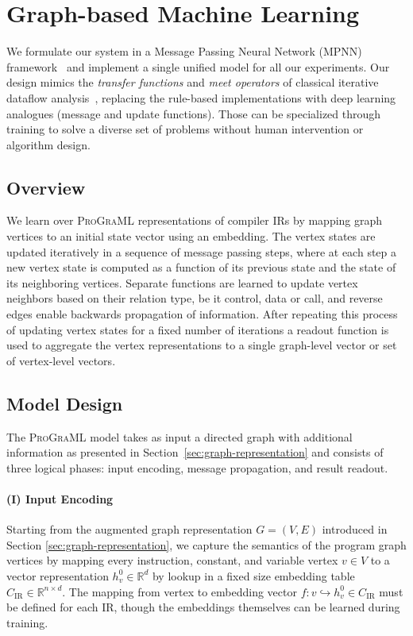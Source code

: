 \section{Graph-based Machine Learning}
\label{sec:graph-based-machine-learning}

We formulate our system in a Message Passing Neural Network (MPNN)
framework~\cite{Gilmer2017,Li2015a} and implement a single unified
model for all our experiments. Our design mimics the \emph{transfer
  functions} and \emph{meet operators} of classical iterative dataflow
analysis~\cite{Kam1977,Cooper2003}, replacing the rule-based
implementations with deep learning analogues (message and update
functions). Those can be specialized through training to solve a
diverse set of problems without human intervention or algorithm
design.


\subsection{Overview}

We learn over \textsc{ProGraML} representations of compiler IRs by
mapping graph vertices to an initial state vector using an
embedding. The vertex states are updated iteratively in a sequence of
message passing steps, where at each step a new vertex state is
computed as a function of its previous state and the state of its
neighboring vertices. Separate functions are learned to update vertex
neighbors based on their relation type, be it control, data or call,
and reverse edges enable backwards propagation of information. After
repeating this process of updating vertex states for a fixed number of
iterations a readout function is used to aggregate the vertex
representations to a single graph-level vector or set of vertex-level
vectors.


\subsection{Model Design}

The \textsc{ProGraML} model takes as input a directed graph with
additional information as presented in
Section~\ref{sec:graph-representation} and consists of three logical
phases: input encoding, message propagation, and result readout.

\paragraph{(I) Input Encoding} Starting from the augmented graph
representation $G = (V, E)$ introduced in Section
\ref{sec:graph-representation}, we capture the semantics of the
program graph vertices by mapping every instruction, constant, and
variable vertex $v \in V$ to a vector representation
$h_v^0 \in \mathbb{R}^{d}$ by lookup in a fixed size embedding table
$C_ \text{IR} \in \mathbb{R}^{n \times d}$. The mapping from vertex to
embedding vector $f: v \hookrightarrow h_v^0 \in C_\text{IR}$ must be
defined for each IR, though the embeddings themselves can be learned
during training.

